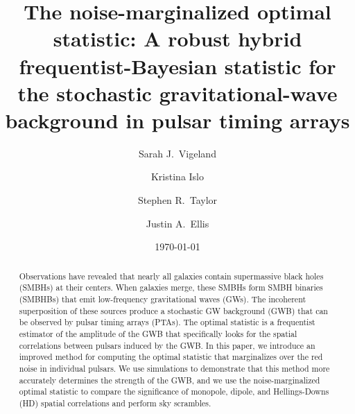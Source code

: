 \documentclass[twocolumn,aps,prd,superscriptaddress]{revtex4-1}
\begin{document}
\title{The noise-marginalized optimal statistic: A robust hybrid frequentist-Bayesian statistic for the stochastic gravitational-wave background in pulsar timing arrays}

\author{Sarah J.\ Vigeland}

\author{Kristina Islo}

\author{Stephen R.\ Taylor}

\author{Justin A.\ Ellis}


\date{\today}  

\begin{abstract}
Observations have revealed that nearly all galaxies 
contain supermassive black holes (SMBHs) at their centers. 
When galaxies merge, these SMBHs form SMBH binaries (SMBHBs) 
that emit low-frequency gravitational waves (GWs). 
The incoherent superposition of these sources produce a stochastic GW background (GWB) 
that can be observed by pulsar timing arrays (PTAs). 
The optimal statistic is a frequentist estimator of the amplitude of the GWB 
that specifically looks for the spatial correlations between pulsars induced by the GWB. 
In this paper, we introduce an improved method for computing the optimal statistic 
that marginalizes over the red noise in individual pulsars. 
We use simulations to demonstrate that this method 
more accurately determines the strength of the GWB, 
and we use the noise-marginalized optimal statistic 
to compare the significance of monopole, dipole, and Hellings-Downs (HD) spatial correlations 
and perform sky scrambles.
\end{abstract}
\end{document}
